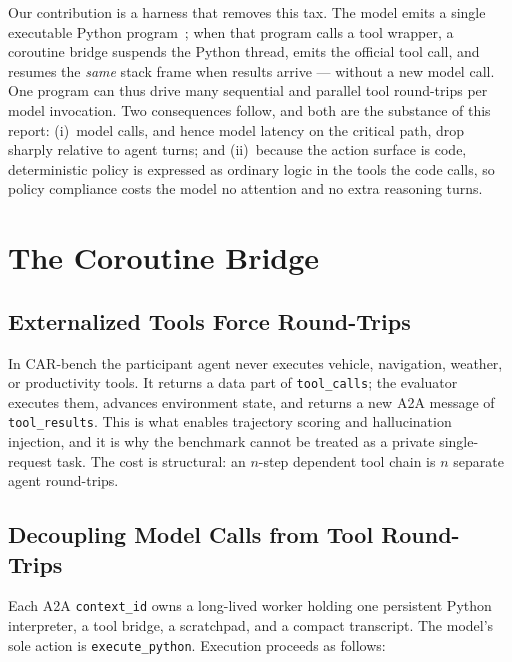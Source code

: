 \documentclass{article}
\begin{document}
Our contribution is a harness that removes this tax. The model emits a single
executable Python program~\cite{wang2024codeact}; when that program calls a
tool wrapper, a coroutine bridge suspends the Python thread, emits the official
tool call, and resumes the \emph{same} stack frame when results arrive ---
without a new model call. One program can thus drive many sequential and
parallel tool round-trips per model invocation. Two consequences follow, and
both are the substance of this report: (i)~model calls, and hence model latency
on the critical path, drop sharply relative to agent turns; and (ii)~because the
action surface is code, deterministic policy is expressed as ordinary logic in
the tools the code calls, so policy compliance costs the model no attention and
no extra reasoning turns.

\section{The Coroutine Bridge}

\subsection{Externalized Tools Force Round-Trips}

In CAR-bench the participant agent never executes vehicle, navigation, weather,
or productivity tools. It returns a data part of \texttt{tool\_calls}; the
evaluator executes them, advances environment state, and returns a new A2A
message of \texttt{tool\_results}. This is what enables trajectory scoring and
hallucination injection, and it is why the benchmark cannot be treated as a
private single-request task. The cost is structural: an $n$-step dependent tool
chain is $n$ separate agent round-trips.

\subsection{Decoupling Model Calls from Tool Round-Trips}

Each A2A \texttt{context\_id} owns a long-lived worker holding one persistent
Python interpreter, a tool bridge, a scratchpad, and a compact transcript. The
model's sole action is \texttt{execute\_python}. Execution proceeds as follows:
\end{document}
